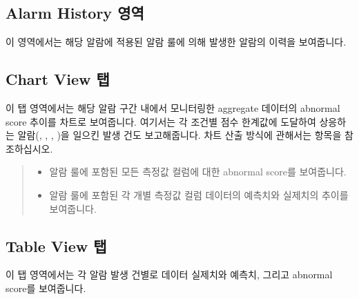 \documentclass[letterpaper,10pt,english]{sphinxmanual}
\begin{document}
\subsection{Alarm History 영역}
\label{\detokenize{anomaly/part05/index:alarm-history}}
이 영역에서는 해당 알람에 적용된 알람 룰에 의해 발생한 알람의 이력을 보여줍니다.
\begin{quote}

\begin{figure}[H]
\centering

\noindent{}
\end{figure}
\end{quote}


\subsection{Chart View 탭}
\label{\detokenize{anomaly/part05/index:chart-view}}
이 탭 영역에서는 해당 알람 구간 내에서 모니터링한 aggregate 데이터의 abnormal score 추이를 차트로 보여줍니다. 여기서는 각 조건별 점수 한계값에 도달하여 상응하는 알람(, , , )을 일으킨 발생 건도 보고해줍니다. 차트 산출 방식에 관해서는 {\hyperref[\detokenize{anomaly/part01/index:basic-principles}]{}} 항목을 참조하십시오.
\begin{quote}

\begin{figure}[H]
\centering

\noindent{}
\end{figure}
\begin{itemize}
\item {} 
 알람 룰에 포함된 모든 측정값 컬럼에 대한 abnormal score를 보여줍니다.

\item {} 
 알람 룰에 포함된 각 개별 측정값 컬럼 데이터의 예측치와 실제치의 추이를 보여줍니다.

\end{itemize}
\end{quote}


\subsection{Table View 탭}
\label{\detokenize{anomaly/part05/index:table-view}}
이 탭 영역에서는 각 알람 발생 건별로 데이터 실제치와 예측치, 그리고 abnormal score를 보여줍니다.
\begin{quote}

\begin{figure}[H]
\centering

\noindent{}
\end{figure}
\end{quote}



\renewcommand{\indexname}{색인}
\printindex
\end{document}
